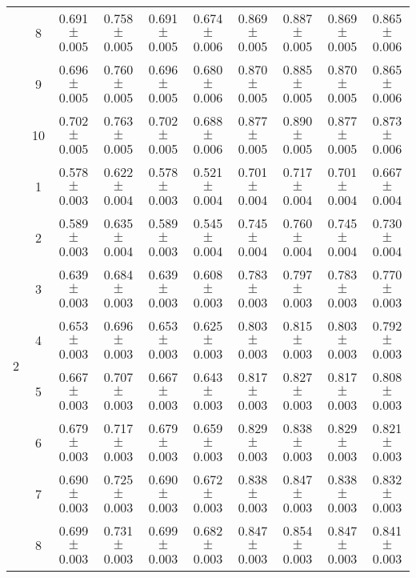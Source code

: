 \begin{table}[htbp]
{\begin{tabular}[]{c|c|cccc|cccc}
  & 8  & 0.691{\tiny$\pm$0.005} & 0.758{\tiny$\pm$0.005} & 0.691{\tiny$\pm$0.005} & 0.674{\tiny$\pm$0.006} & 0.869{\tiny$\pm$0.005} & 0.887{\tiny$\pm$0.005} & 0.869{\tiny$\pm$0.005} & 0.865{\tiny$\pm$0.006} \\
  & 9  & 0.696{\tiny$\pm$0.005} & 0.760{\tiny$\pm$0.005} & 0.696{\tiny$\pm$0.005} & 0.680{\tiny$\pm$0.006} & 0.870{\tiny$\pm$0.005} & 0.885{\tiny$\pm$0.005} & 0.870{\tiny$\pm$0.005} & 0.865{\tiny$\pm$0.006} \\
  & 10 & 0.702{\tiny$\pm$0.005} & 0.763{\tiny$\pm$0.005} & 0.702{\tiny$\pm$0.005} & 0.688{\tiny$\pm$0.006} & 0.877{\tiny$\pm$0.005} & 0.890{\tiny$\pm$0.005} & 0.877{\tiny$\pm$0.005} & 0.873{\tiny$\pm$0.006} \\
\midrule
\multirow{10}{*}{2} 
  & 1  & 0.578{\tiny$\pm$0.003} & 0.622{\tiny$\pm$0.004} & 0.578{\tiny$\pm$0.003} & 0.521{\tiny$\pm$0.004} & 0.701{\tiny$\pm$0.004} & 0.717{\tiny$\pm$0.004} & 0.701{\tiny$\pm$0.004} & 0.667{\tiny$\pm$0.004} \\
  & 2  & 0.589{\tiny$\pm$0.003} & 0.635{\tiny$\pm$0.004} & 0.589{\tiny$\pm$0.003} & 0.545{\tiny$\pm$0.004} & 0.745{\tiny$\pm$0.004} & 0.760{\tiny$\pm$0.004} & 0.745{\tiny$\pm$0.004} & 0.730{\tiny$\pm$0.004} \\
  & 3  & 0.639{\tiny$\pm$0.003} & 0.684{\tiny$\pm$0.003} & 0.639{\tiny$\pm$0.003} & 0.608{\tiny$\pm$0.003} & 0.783{\tiny$\pm$0.003} & 0.797{\tiny$\pm$0.003} & 0.783{\tiny$\pm$0.003} & 0.770{\tiny$\pm$0.003} \\
  & 4  & 0.653{\tiny$\pm$0.003} & 0.696{\tiny$\pm$0.003} & 0.653{\tiny$\pm$0.003} & 0.625{\tiny$\pm$0.003} & 0.803{\tiny$\pm$0.003} & 0.815{\tiny$\pm$0.003} & 0.803{\tiny$\pm$0.003} & 0.792{\tiny$\pm$0.003} \\
  & 5  & 0.667{\tiny$\pm$0.003} & 0.707{\tiny$\pm$0.003} & 0.667{\tiny$\pm$0.003} & 0.643{\tiny$\pm$0.003} & 0.817{\tiny$\pm$0.003} & 0.827{\tiny$\pm$0.003} & 0.817{\tiny$\pm$0.003} & 0.808{\tiny$\pm$0.003} \\
  & 6  & 0.679{\tiny$\pm$0.003} & 0.717{\tiny$\pm$0.003} & 0.679{\tiny$\pm$0.003} & 0.659{\tiny$\pm$0.003} & 0.829{\tiny$\pm$0.003} & 0.838{\tiny$\pm$0.003} & 0.829{\tiny$\pm$0.003} & 0.821{\tiny$\pm$0.003} \\
  & 7  & 0.690{\tiny$\pm$0.003} & 0.725{\tiny$\pm$0.003} & 0.690{\tiny$\pm$0.003} & 0.672{\tiny$\pm$0.003} & 0.838{\tiny$\pm$0.003} & 0.847{\tiny$\pm$0.003} & 0.838{\tiny$\pm$0.003} & 0.832{\tiny$\pm$0.003} \\
  & 8  & 0.699{\tiny$\pm$0.003} & 0.731{\tiny$\pm$0.003} & 0.699{\tiny$\pm$0.003} & 0.682{\tiny$\pm$0.003} & 0.847{\tiny$\pm$0.003} & 0.854{\tiny$\pm$0.003} & 0.847{\tiny$\pm$0.003} & 0.841{\tiny$\pm$0.003} \\

\end{tabular}}
\end{table}
